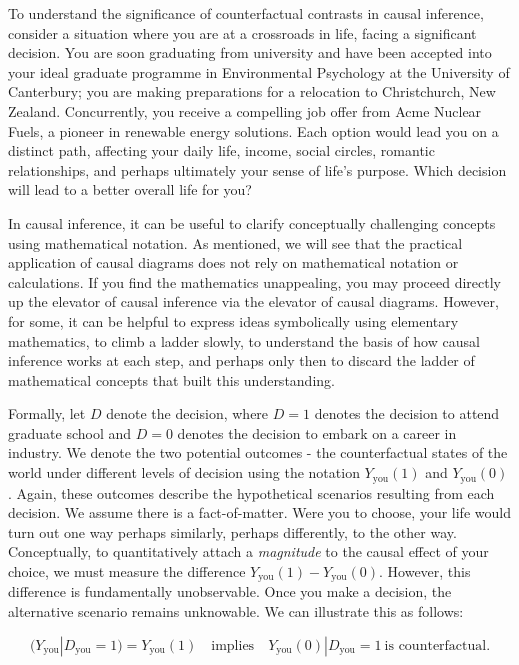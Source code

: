 \documentclass[
  singlecolumn]{article}
\begin{document}
To understand the significance of counterfactual contrasts in causal
inference, consider a situation where you are at a crossroads in life,
facing a significant decision. You are soon graduating from university
and have been accepted into your ideal graduate programme in
Environmental Psychology at the University of Canterbury; you are making
preparations for a relocation to Christchurch, New Zealand.
Concurrently, you receive a compelling job offer from Acme Nuclear
Fuels, a pioneer in renewable energy solutions. Each option would lead
you on a distinct path, affecting your daily life, income, social
circles, romantic relationships, and perhaps ultimately your sense of
life's purpose. Which decision will lead to a better overall life for
you?

In causal inference, it can be useful to clarify conceptually
challenging concepts using mathematical notation. As mentioned, we will
see that the practical application of causal diagrams does not rely on
mathematical notation or calculations. If you find the mathematics
unappealing, you may proceed directly up the elevator of causal
inference via the elevator of causal diagrams. However, for some, it can
be helpful to express ideas symbolically using elementary mathematics,
to climb a ladder slowly, to understand the basis of how causal
inference works at each step, and perhaps only then to discard the
ladder of mathematical concepts that built this understanding.

Formally, let \(D\) denote the decision, where \(D = 1\) denotes the
decision to attend graduate school and \(D=0\) denotes the decision to
embark on a career in industry. We denote the two potential outcomes -
the counterfactual states of the world under different levels of
decision using the notation \(Y_{\text{you}}(1)\) and
\(Y_{\text{you}}(0)\). Again, these outcomes describe the hypothetical
scenarios resulting from each decision. We assume there is a
fact-of-matter. Were you to choose, your life would turn out one way
perhaps similarly, perhaps differently, to the other way. Conceptually,
to quantitatively attach a \emph{magnitude} to the causal effect of your
choice, we must measure the difference
\(Y_{\text{you}}(1) - Y_{\text{you}}(0)\). However, this difference is
fundamentally unobservable. Once you make a decision, the alternative
scenario remains unknowable. We can illustrate this as follows:

\[
(Y_{\text{you}}|D_{\text{you}} = 1) = Y_{\text{you}}(1) \quad \text{implies} \quad Y_{\text{you}}(0)|D_{\text{you}} = 1~ \text{is counterfactual}.
\]
\end{document}
